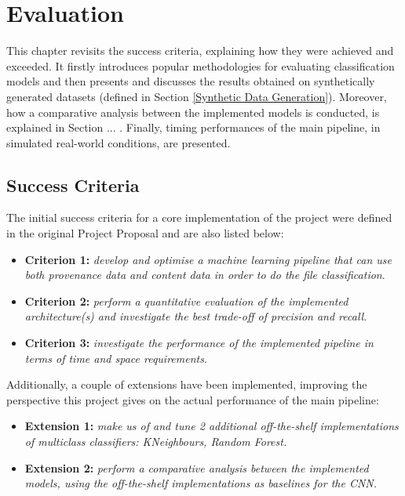 

    \chapter{Evaluation}
    
    This chapter revisits the success criteria, explaining how they were achieved and exceeded. It firstly introduces popular methodologies for evaluating classification models and then presents and discusses the results obtained on synthetically generated datasets (defined in Section \ref{Synthetic Data Generation}). Moreover, how a comparative analysis between the implemented models is conducted, is explained in Section ... . Finally, timing performances of the main pipeline, in simulated real-world conditions, are presented. \\
    
    \section{Success Criteria}
    
    The initial success criteria for a core implementation of the project were defined in the original Project Proposal and are also listed below: 
    
    \begin{itemize}
        \item \textbf{Criterion 1:} \textit{develop and optimise a machine learning pipeline that can use both provenance data and content data in order to do the file classification}. \greencheck
        
        \item \textbf{Criterion 2:} \textit{perform a quantitative evaluation of the implemented architecture(s) and investigate the best trade-off of precision and recall}. \greencheck
        
        \item \textbf{Criterion 3:} \textit{investigate the performance of the implemented pipeline in terms of time and space requirements}. \greencheck
    
    \end{itemize}
        
    Additionally, a couple of extensions have been implemented, improving the perspective this project gives on the actual performance of the main pipeline: 
    
    \begin{itemize}
        \item \textbf{Extension 1:} \textit{make us of and tune 2 additional off-the-shelf implementations of multiclass classifiers: KNeighbours, Random Forest.} \greencheck
        
        \item \textbf{Extension 2:} \textit{perform a comparative analysis between the implemented models, using the off-the-shelf implementations as baselines for the CNN.} \greencheck
        
    \end{itemize}
    
